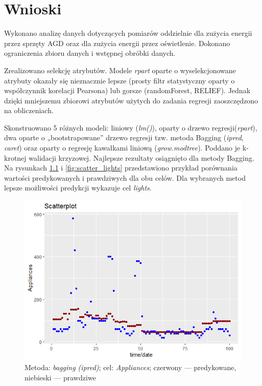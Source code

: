 \documentclass[a4paper,11pt,twoside]{mwrep}  %
\begin{document}
\endgroup

\begingroup
\let\clearpage\relax
\chapter{Wnioski}

Wykonano analizę danych dotyczących pomiarów oddzielnie dla zużycia energii przez sprzęty AGD oraz dla zużycia energii przez oświetlenie. Dokonano ograniczenia zbioru danych i wstępnej obróbki danych.
\par
Zrealizowano selekcję atrybutów. Modele \textit{rpart} oparte o wyselekcjonowane atrybuty okazały się nieznacznie lepsze (prosty filtr statystyczny oparty o współczynnik korelacji Pearsona) lub gorsze
(randomForest, RELIEF). Jednak dzięki mniejszemu zbiorowi atrybutów użytych do zadania regresji zaoszczędzono na obliczeniach.
\par
Skonstruowano 5 różnych modeli: liniowy (\textit{lm()}), oparty o drzewo regresji(\textit{rpart}), dwa oparte o „bootstrapowane” drzewo regresji tzw. metoda Bagging (\textit{ipred}, \textit{caret}) oraz oparty o regresję kawałkami liniową (\textit{grow.modtree}). Poddano je k-krotnej walidacji krzyzowej. Najlepsze rezultaty osiągnięto dla metody Bagging. Na rysunkach \ref{fig:scatter_app} i \ref{fig:scatter_lights} przedstawiono przykład porównania wartości predykowanych i prawdziwych dla obu celów. Dla wybranych metod lepsze możliwości predykcji wykazuje cel \textit{lights}.

\begin{figure}[!h]
    \centering \includegraphics{../scatter_app.png}
    \caption{Metoda: \textit{bagging (ipred)}; cel: \textit{Appliances}; czerwony --- predykowane, niebieski --- prawdziwe}
    \label{fig:scatter_app}
\end{figure}
\end{document}
